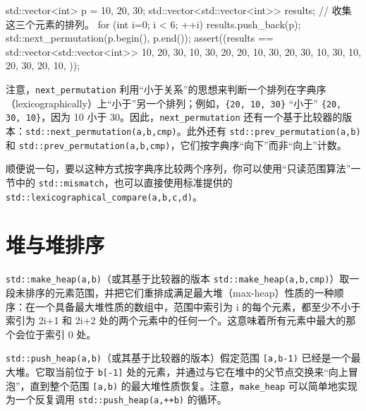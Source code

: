 \begin{codebox}[cpp]
     std::vector<int> p = {10, 20, 30};
     std::vector<std::vector<int>> results;
     // 收集这三个元素的排列。
     for (int i=0; i < 6; ++i) {
       results.push_back(p);
       std::next_permutation(p.begin(), p.end());
     }
     assert((results == std::vector<std::vector<int>>{
       {10, 20, 30},
       {10, 30, 20},
       {20, 10, 30},
       {20, 30, 10},
       {30, 10, 20},
       {30, 20, 10},
     }));
\end{codebox}

注意，\texttt{next\_\allowbreak{}permutation} 利用“小于关系”的思想来判断一个排列在字典序（lexicographically）上“小于”另一个排列；例如，\texttt{\{20,\allowbreak{} 10,\allowbreak{} 30\}} “小于” \texttt{\{20,\allowbreak{} 30,\allowbreak{} 10\}}，因为 10 小于 30。因此，\texttt{next\_\allowbreak{}permutation} 还有一个基于比较器的版本：\texttt{std::\allowbreak{}next\_\allowbreak{}permutation(\allowbreak{}a,\allowbreak{}b,\allowbreak{}cmp)\allowbreak{}}。此外还有 \texttt{std::\allowbreak{}prev\_\allowbreak{}permutation(\allowbreak{}a,\allowbreak{}b)\allowbreak{}} 和 \texttt{std::\allowbreak{}prev\_\allowbreak{}permutation(\allowbreak{}a,\allowbreak{}b,\allowbreak{}cmp)\allowbreak{}}，它们按字典序“向下”而非“向上”计数。

顺便说一句，要以这种方式按字典序比较两个序列，你可以使用“只读范围算法”一节中的 \texttt{std::\allowbreak{}mismatch}，也可以直接使用标准提供的 \texttt{std::\allowbreak{}lexicographical\_\allowbreak{}compare(\allowbreak{}a,\allowbreak{}b,\allowbreak{}c,\allowbreak{}d)\allowbreak{}}。

\section{堆与堆排序}

\texttt{std::\allowbreak{}make\_\allowbreak{}heap(\allowbreak{}a,\allowbreak{}b)\allowbreak{}}（或其基于比较器的版本 \texttt{std::\allowbreak{}make\_\allowbreak{}heap(\allowbreak{}a,\allowbreak{}b,\allowbreak{}cmp)\allowbreak{}}）取一段未排序的元素范围，并把它们重排成满足最大堆（max-heap）性质的一种顺序：在一个具备最大堆性质的数组中，范围中索引为 i 的每个元素，都至少不小于索引为 2i+1 和 2i+2 处的两个元素中的任何一个。这意味着所有元素中最大的那个会位于索引 0 处。

\texttt{std::\allowbreak{}push\_\allowbreak{}heap(\allowbreak{}a,\allowbreak{}b)\allowbreak{}}（或其基于比较器的版本）假定范围 \texttt{[a,\allowbreak{}b-1)\allowbreak{}} 已经是一个最大堆。它取当前位于 \texttt{b[-1]} 处的元素，并通过与它在堆中的父节点交换来“向上冒泡”，直到整个范围 \texttt{[a,\allowbreak{}b)\allowbreak{}} 的最大堆性质恢复。注意，\texttt{make\_\allowbreak{}heap} 可以简单地实现为一个反复调用 \texttt{std::\allowbreak{}push\_\allowbreak{}heap(\allowbreak{}a,\allowbreak{}++b)\allowbreak{}} 的循环。

